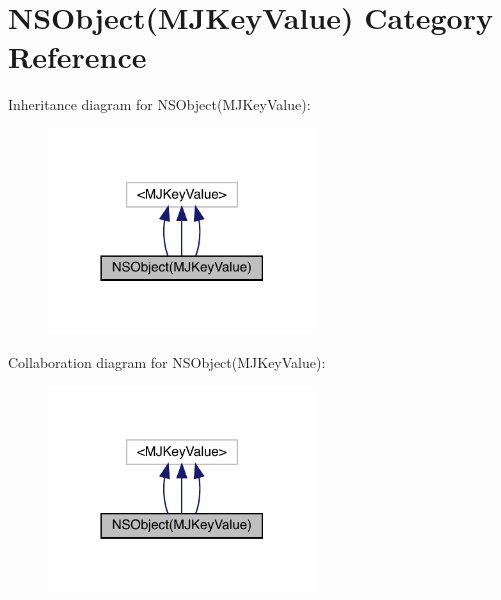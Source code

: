 \hypertarget{category_n_s_object_07_m_j_key_value_08}{}\section{N\+S\+Object(M\+J\+Key\+Value) Category Reference}
\label{category_n_s_object_07_m_j_key_value_08}


Inheritance diagram for N\+S\+Object(M\+J\+Key\+Value)\+:\nopagebreak
\begin{figure}[H]
\begin{center}
\leavevmode
\includegraphics[width=201pt]{category_n_s_object_07_m_j_key_value_08__inherit__graph}
\end{center}
\end{figure}


Collaboration diagram for N\+S\+Object(M\+J\+Key\+Value)\+:\nopagebreak
\begin{figure}[H]
\begin{center}
\leavevmode
\includegraphics[width=201pt]{category_n_s_object_07_m_j_key_value_08__coll__graph}
\end{center}
\end{figure}
